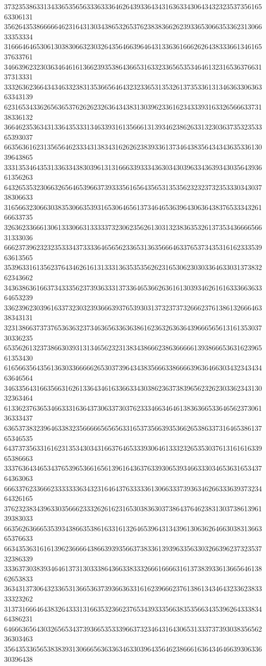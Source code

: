 37323538633134336535656333633364626439336434316363343064343232353735616563306131
35626435386666646231643130343865326537623838366262393365306635336231306633353334
31666464653061303830663230326435646639646431336361666262643833366134616537633761
34663962323036346461613662393538643665316332336565353464613231653637663137313331
33326362366434346332383135366564643232336531353261373533613134636330636363343139
62316534336265636537626262326364343831303962336162343339316332656663373138336132
36646235363431336435333134633931613566613139346238626331323036373532353365393037
66356361623135656462333431383431626262383933613734643835643434363533613039643865
33313534643531336334383039613131666339333436303430396334363934303564393661356263
64326535323066326564653966373933356165643565313535623232373235333034303738306633
31656632306630383530663539316530646561373464653639643063643837653334326166633735
32636233666130613330663133333732306235626130313238363532613735343666656631333036
66623739623232353334373333646565623365313635666463376537343531616233353963613565
35396331613562376434626161313331363535356262316530623030336463303137383262343662
34363863616637343335623739363331373364653662636161303934626161633366363364653239
33623962303961633732303239366639376539303137323737326662376138613266646338343131
32313866373737653636323734636563363638616236326363643966656561316135303730336235
65356261323738663039313134656232313834386662386366666139386665363162396561353430
61656635643561363033666662653037396434383566633866663963646630343234343463646564
34633564316635663162613364346163366334303862363738396562326230336234313032363464
61336237636534663331636437306337303762333466346461383636653364656237306136333437
63653738323964633832356666656565633165373566393536626538633731646538613765346535
64373735633161623135343034316637646533393064613332326535303761316161633965386663
33376364346534376539653661656139616436376339306539346633303465363165343764363063
66633762336662333333363432316464376333336130663337393634626633363937323464326165
37623238343963303566623332626162316530383630373864376462383130373861396139383033
66356263666535393438663538616331613264653964313439613063626466303831366365376633
66343536316161396236666438663939356637383361393963356330326639623732353732386339
33363730383934646137313033386436633833326661666631613738393361366564613862653833
36343137306432336531366536373936636331616239666237613861343464323362383333323262
31373166646438326433313166353236623765343933356638353566343539626433383464386231
64666365643032656534373936653533396637323464316430653133373739303835656236303463
35643533656538383931306665636336346330396435646238666163643464663930633630396438
